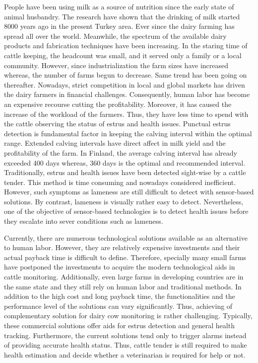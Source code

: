 \documentclass[english,12pt,a4paper,pdftex,elec,utf8]{aaltothesis}
\begin{document}
People have been using milk as a source of nutrition since the early state of animal husbandry. The research have shown that the drinking of milk started 8000 years ago in the present Turkey area. Ever since the dairy farming has spread all over the world. Meanwhile, the spectrum of the available dairy products and fabrication techniques have been increasing. In the staring time of cattle keeping, the headcount was small, and it served only a family or a local community. However, since industrialization the farm sizes have increased whereas, the number of farms begun to decrease. Same trend has been going on thereafter. Nowadays, strict competition in local and global markets has driven the dairy farmers in financial challenges. Consequently, human labor has become an expensive recourse cutting the profitability. Moreover, it has caused the increase of the workload of the farmers. Thus, they have less time to spend with the cattle observing the status of estrus and health issues. Punctual estrus detection is fundamental factor in keeping the calving interval within the optimal range. Extended calving intervals have direct affect in milk yield and the profitability of the farm. In Finland, the average calving interval has already exceeded 400 days whereas, 360 days is the optimal and recommended interval. Traditionally, estrus and health issues have been detected sight-wise by a cattle tender. This method is time consuming and nowadays considered inefficient. However, such symptoms as lameness are still difficult to detect with sensor-based solutions. By contrast, lameness is visually rather easy to detect. Nevertheless, one of the objective of sensor-based technologies is to detect health issues before they escalate into sever conditions such as lameness.

Currently, there are numerous technological solutions available as an alternative to human labor. However, they are relatively expensive investments and their actual payback time is difficult to define. Therefore, specially many small farms have postponed the investments to acquire the modern technological aids in cattle monitoring. Additionally, even large farms in developing countries are in the same state and they still rely on human labor and traditional methods. In addition to the high cost and long payback time, the functionalities and the performance level of the solutions can vary significantly. Thus, achieving of complementary solution for dairy cow monitoring is rather challenging. Typically, these commercial solutions offer aids for estrus detection and general health tracking. Furthermore, the current solutions tend only to trigger alarms instead of providing accurate health status. Thus, cattle tender is still required to make health estimation and decide whether a veterinarian is required for help or not.
\end{document}

